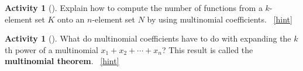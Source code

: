 \documentclass[10pt,]{book}
\newcommand{\terminology}[1]{\textbf{#1}}
\theoremstyle{plain}
\theoremstyle{definition}
\theoremstyle{definition}
\theoremstyle{definition}
\newtheorem{activity}[project]{Activity}
\numberwithin{equation}{chapter}
\begin{document}
\begin{activity}[]\label{activity-221}
\hypertarget{p-1024}{}%
Explain how to compute the number of functions from a \(k\)-element set \(K\) onto an \(n\)-element set \(N\) by using multinomial coefficients.%
~\hfill{\tiny\hyperlink{a-221}{[hint]}\hypertarget{q-221}{}}\end{activity}
\begin{activity}[]\label{activity-222}
\hypertarget{p-1027}{}%
What do multinomial coefficients have to do with expanding the \(k\)th power of a multinomial \(x_1+x_2+\cdots+x_n\)? This result is called the \terminology{multinomial theorem}.%
~\hfill{\tiny\hyperlink{a-222}{[hint]}\hypertarget{q-222}{}}\end{activity}
\typeout{************************************************}
\typeout{************************************************}
\end{document}
